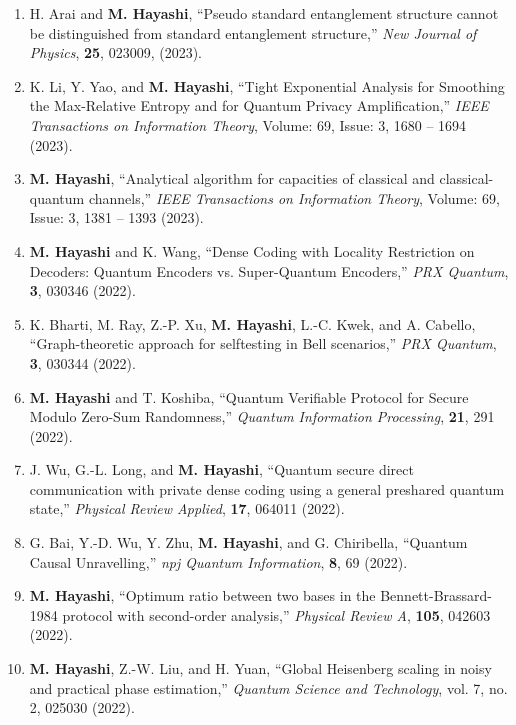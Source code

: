 \documentclass[a4paper,12pt,oneside]{article}
\begin{document}
\begin{enumerate}
\item
H. Arai and \textbf{M. Hayashi},
``Pseudo standard entanglement structure cannot be distinguished from standard entanglement structure,''
{\em New Journal of Physics},
{\bf 25}, 023009, (2023).

\item
K. Li, Y. Yao, and \textbf{M. Hayashi}, 
``Tight Exponential Analysis for Smoothing the Max-Relative Entropy and for Quantum Privacy Amplification,''
{\em IEEE Transactions on Information Theory},
Volume: 69, Issue: 3, 1680 – 1694 (2023).

\item
\textbf{M. Hayashi},
``Analytical algorithm for capacities of classical and classical-quantum channels,''
{\em IEEE Transactions on Information Theory},
Volume: 69, Issue: 3, 1381 – 1393 (2023).

\item
\textbf{M. Hayashi} and K. Wang,
``Dense Coding with Locality Restriction on Decoders: Quantum Encoders vs. Super-Quantum Encoders,''
{\em PRX Quantum},
{\bf 3}, 030346 (2022).

\item
K. Bharti, M. Ray, Z.-P. Xu, \textbf{M. Hayashi}, L.-C. Kwek, and A. Cabello,
``Graph-theoretic approach for selftesting in Bell scenarios,''
{\em PRX Quantum},
{\bf 3}, 030344 (2022).

\item
\textbf{M. Hayashi} and T. Koshiba,
``Quantum Verifiable Protocol for Secure Modulo Zero-Sum Randomness,''
{\em Quantum Information Processing},
{\bf 21}, 291 (2022).

\item
J. Wu, G.-L. Long, and \textbf{M. Hayashi},
``Quantum secure direct communication with private dense coding using a general preshared quantum state,''
{\em Physical Review Applied},
{\bf 17}, 064011 (2022).

\item
G. Bai, Y.-D. Wu, Y. Zhu, \textbf{M. Hayashi}, and G. Chiribella,
``Quantum Causal Unravelling,''
{\em npj Quantum Information},
{\bf 8}, 69 (2022).

\item
\textbf{M. Hayashi},
``Optimum ratio between two bases in the Bennett-Brassard-1984 protocol with second-order analysis,''
{\em Physical Review A},
{\bf 105}, 042603 (2022).

\item
\textbf{M. Hayashi}, Z.-W. Liu, and H. Yuan,
``Global Heisenberg scaling in noisy and practical phase estimation,''
{\em Quantum Science and Technology},
vol. 7, no. 2, 025030 (2022).


\end{enumerate}
\end{document}
